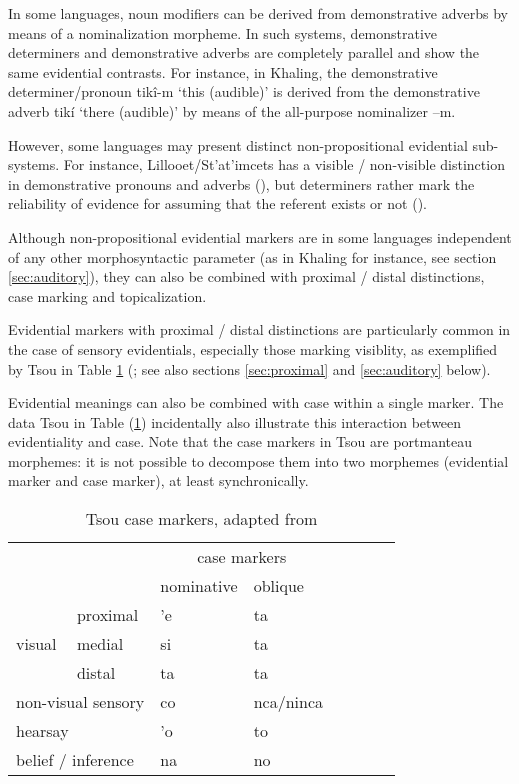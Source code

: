 \documentclass[oneside,a4paper,11pt]{article}
\newcommand{\ipa}[1]{{\phon \mbox{#1}}} %
\begin{document}
In some languages, noun modifiers can be derived from demonstrative adverbs by means of a nominalization morpheme. In such systems, demonstrative determiners and demonstrative adverbs are completely parallel and show the same evidential contrasts. For instance, in Khaling, the demonstrative determiner/pronoun \ipa{tikî-m} `this (audible)' is derived from the demonstrative adverb \ipa{tikí} `there (audible)' by means of the all-purpose nominalizer \ipa{--m}.

However, some languages may present distinct non-propositional evidential sub-systems. For instance, Lillooet/St'at'imcets has a visible / non-visible distinction in demonstrative pronouns and adverbs (\citealt[169, 171]{eijk97lillooet}), but determiners rather mark the reliability of evidence for assuming that the referent exists or not (\citealt{matthewson98determiners, gutierrez12determiners}).

Although non-propositional evidential markers are in some languages independent of any other morphosyntactic parameter (as in Khaling for instance, see section \ref{sec:auditory}), they can also be combined with  proximal / distal distinctions, case marking and topicalization.

Evidential markers with proximal / distal distinctions are particularly common in the case of sensory evidentials, especially those marking visiblity, as exemplified by Tsou in Table \ref{tab:tsou} (\citealt[54]{yang00tsou.case}; see also sections \ref{sec:proximal} and \ref{sec:auditory} below). 

Evidential meanings can also be combined with case within a single marker. The data Tsou in Table (\ref{tab:tsou}) incidentally also illustrate this interaction between evidentiality and case. Note that the case markers in Tsou are portmanteau morphemes: it is not possible to decompose them into two morphemes (evidential marker and case marker), at least synchronically.  
 
\begin{table}[H]
 \caption{Tsou case markers, adapted from \citet[54]{yang00tsou.case}} \centering \label{tab:tsou}
\begin{tabular}{llllllll}
\toprule
	 & 	 & 	\multicolumn{2}{c}{case markers } 	 \\	
	 & 	 & 	nominative & 	oblique \\	
\midrule
	 & 	proximal & 	\ipa{'e} & 	\ipa{ta} \\ 	
visual	 & 	medial & 	\ipa{si} & 	\ipa{ta}  \\ 	
	 & 	distal & 	\ipa{ta} & 	\ipa{ta}  \\ 	
\multicolumn{2}{l}{non-visual sensory}  	 & 	\ipa{co} & 	\ipa{nca/ninca} \\ 	
	 \midrule
\multicolumn{2}{l}{hearsay}	 & 	\ipa{'o} & 	\ipa{to} \\ 	
\multicolumn{2}{l}{belief / inference} 	 & 	\ipa{na} & 	\ipa{no} \\ 	
\bottomrule
\end{tabular}
\end{table} 
\end{document}
